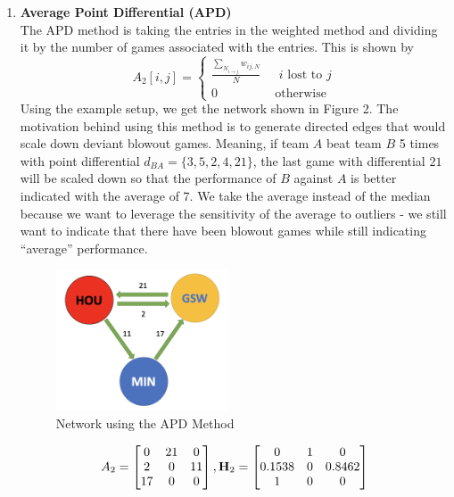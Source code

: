 \documentclass[12pt]{article}%
\begin{document}
\begin{enumerate}
  \item \textbf{Average Point Differential (APD)}\\
  \null\quad\quad The APD method is taking the entries in the weighted method and dividing it by the number of games associated with the entries. This is shown by 
  \[
  A_{2}[i,j]=
  \begin{cases}
  \frac{\sum_{N_{i\rightarrow j}}w_{ij,N}}N &\text{ $i$ lost to $j$}\\
  0 &\text{ otherwise}
  \end{cases}
  \]
  Using the example setup, we get the network shown in Figure 2. The motivation behind using this method is to generate directed edges that would scale down deviant blowout games. Meaning, if team $A$ beat team $B$ 5 times with point differential $d_{BA}=\{3,5,2,4,21\}$, the last game with differential $21$ will be scaled down so that the performance of $B$ against $A$ is better indicated with the average of $7$. We take the average instead of the median because we want to leverage the sensitivity of the average to outliers - we still want to indicate that there have been blowout games while still indicating ``average'' performance. 
  \begin{figure}[H]
	\centering
	\includegraphics[width=2in]{./images/APD.png}
	\caption[Network using the APD Method]{Network using the APD Method}
\end{figure}
\begin{align*}
A_2 =\begin{bmatrix}0 & 21 & 0\\2 & 0 & 11\\17 & 0 & 0\end{bmatrix}, \textbf H_2=\begin{bmatrix}0 & 1 & 0\\0.1538 & 0 & 0.8462\\1 & 0 & 0\end{bmatrix}
\end{align*}
  

\end{enumerate}
\end{document}
